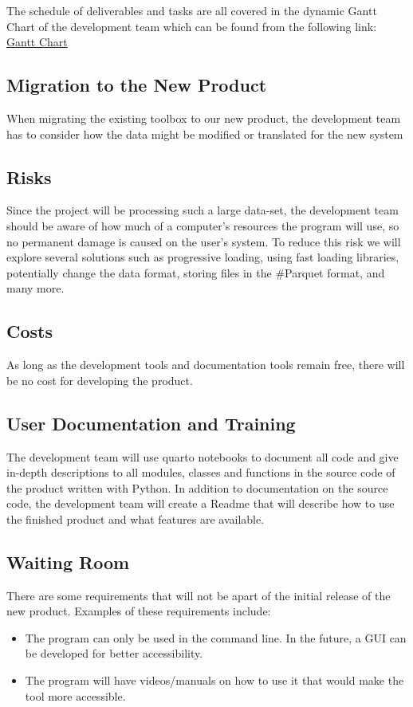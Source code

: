 \documentclass[12pt, titlepage]{article}
\begin{document}
The schedule of deliverables and tasks are all covered in the dynamic Gantt Chart of the development team which can be found from the following link:
\href{https://github.com/paezha/PyERT-BLACK/blob/main/docs/Project%20Schedule/Proejct%20schedule.pdf}{Gantt Chart}

\subsection{Migration to the New Product}
When migrating the existing toolbox to our new product, the development team has to consider how the data might be modified or translated for the new system

\subsection{Risks}
Since the project will be processing such a large data-set, the development team should be aware of how much of a computer's resources the program will use, so no permanent damage is caused on the user's system. To reduce this risk we will explore several solutions such as progressive loading, using fast loading libraries, potentially change the data format, storing files in
the \#Parquet format, and many more. 

\subsection{Costs}
As long as the development tools and documentation tools remain free, there will be no cost for developing the product.  

\subsection{User Documentation and Training}
The development team will use quarto notebooks to document all code and give in-depth descriptions to all modules, classes and functions in the source code of the product written with Python. In addition to documentation on the source code, the development team will create a Readme that will describe how to use the finished product and what features are available.

\subsection{Waiting Room}
There are some requirements that will not be apart of the initial release of the new product. Examples of these requirements include:
\begin{itemize}
    \item The program can only be used in the command line. In the future, a GUI can be developed for better accessibility.
    \item The program will have videos/manuals on how to use it that would make the tool more accessible.
\end{itemize}
\end{document}

